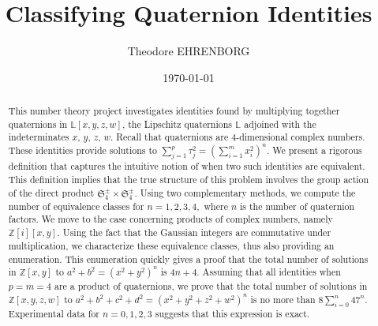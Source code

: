 \documentclass[12pt,table]{article}
\theoremstyle{definition}
\theoremstyle{remark}
\newcommand{\Zzz}{\mathbb Z}
\newcommand{\Lll}{\mathbb L}
\newcommand{\fix}[1]{\todo[inline]{#1}}
\numberwithin{equation}{section}
\begin{document}


\title{Classifying Quaternion Identities}





\author{\sc Theodore EHRENBORG
\fix{I should thank Professor Leep.}
}



\date{\today}

\maketitle



\begin{abstract}
This number theory project investigates identities found by
multiplying together quaternions in $ \Lll[x,y,z,w] $, the
Lipschitz quaternions $ \Lll $ adjoined with the
indeterminates $x$, $y$, $z$, $w$.  Recall that quaternions
are $4$-dimensional complex numbers.  These identities provide
solutions to $ \sum_{j = 1}^{p} \tau_j ^ 2 = \left( \sum_{i = 1}^{m}
x_i ^ 2 \right) ^ n $. We present a rigorous definition that captures
the intuitive notion of when two such identities are equivalent. This
definition implies that the true structure of this problem involves the
group action of the direct product $ \mathfrak{S}_4^\pm \times \mathfrak{S}_4^\pm $.  Using
two complementary methods, we compute the number of equivalence
classes for $n = 1, 2, 3, 4,$ where $n$ is the number of
quaternion factors. We move to the case concerning products of complex
numbers, namely $ \Zzz[i][x,y] $. Using the fact that the
Gaussian integers are commutative under multiplication, we
characterize these equivalence classes, thus also providing an
enumeration.
This enumeration quickly gives a proof that
the total number of solutions in $\Zzz[x,y] $
to $a^2 + b^2 = (x^2 + y^2)^n$
is $4n + 4$.
Assuming that all identities when $p = m = 4$
are a product of quaternions, we prove
that
the total number of solutions in $\Zzz[x,y,z,w] $
to $a^2 + b^2 + c^2 + d^2 = (x^2 + y^2 + z^2 + w^2)^n$
is no more than
$ 8 \sum_{i = 0}^n{47^n} $.
Experimental data for $n = 0,1,2,3$
suggests that this expression
is exact.

\end{abstract}
\end{document}
